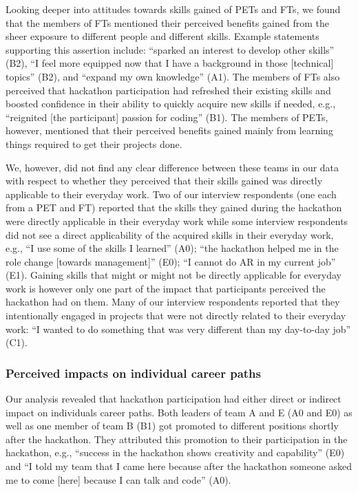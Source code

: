 \documentclass{hcij}
\begin{document}
Looking deeper into attitudes towards skills gained of PETs and FTs, we found that the members of FTs mentioned their perceived benefits gained from the sheer exposure to different people and different skills. Example statements supporting this assertion include: “sparked an interest to develop other skills” (B2), “I feel more equipped now that I have a background in those [technical] topics” (B2), and “expand my own knowledge” (A1). The members of FTs also perceived that hackathon participation had refreshed their existing skills and boosted confidence in their ability to quickly acquire new skills if needed, e.g., “reignited [the participant] passion for coding” (B1). The members of PETs, however, mentioned that their perceived benefits gained mainly from learning things required to get their projects done.

We, however, did not find any clear difference between these teams in our data with respect to whether they perceived that their skills gained was directly applicable to their everyday work. Two of our interview respondents (one each from a PET and FT) reported that the skills they gained during the hackathon were directly applicable in their everyday work while some interview respondents did not see a direct applicability of the acquired skills in their everyday work, e.g., “I use some of the skills I learned” (A0); “the hackathon helped me in the role change [towards management]” (E0); “I cannot do AR in my current job” (E1). Gaining skills that might or might not be directly applicable for everyday work is however only one part of the impact that participants perceived the hackathon had on them. Many of our interview respondents reported that they intentionally engaged in projects that were not directly related to their everyday work: “I wanted to do something that was very different than my day-to-day job” (C1).

\subsubsection{Perceived impacts on individual career paths}
Our analysis revealed that hackathon participation had either direct or indirect impact on individuals career paths. Both leaders of team A and E (A0 and E0) as well as one member of team B (B1) got promoted to different positions shortly after the hackathon. They attributed this promotion to their participation in the hackathon, e.g., “success in the hackathon shows creativity and capability” (E0) and “I told my team that I came here because after the hackathon someone asked me to come [here] because I can talk and code” (A0).
\end{document}
